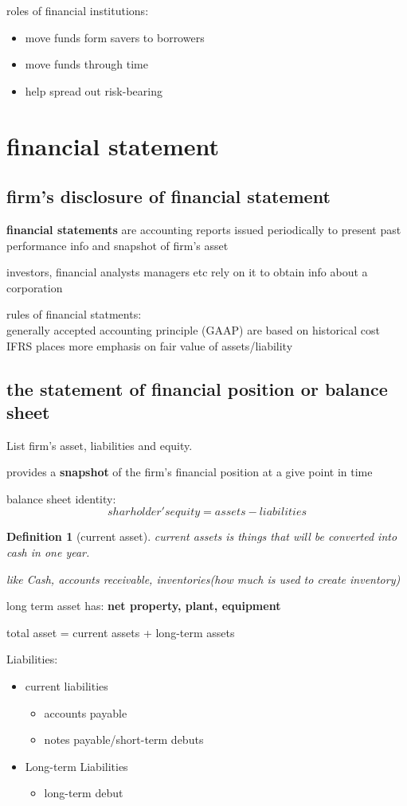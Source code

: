\documentclass[10pt]{article}
\theoremstyle{break}
\newtheorem{defn}{Definition}[subsection]
\begin{document}
roles of financial institutions:
\begin{itemize}
    \item move funds form savers to borrowers 
    \item move funds through time 
    \item help spread out risk-bearing
\end{itemize}

\section{financial statement}
\subsection{firm's disclosure of financial statement}
\textbf{financial statements} are accounting reports issued periodically to present past performance info and snapshot of firm's asset 

investors, financial analysts managers etc rely on it to obtain info about a corporation

rules of financial statments:\\
generally accepted accounting principle (GAAP) are based on historical cost 
IFRS places more emphasis on fair value of assets/liability

\subsection{the statement of financial position or balance sheet}
List firm's asset, liabilities and equity.

provides a \textbf{snapshot} of the firm's financial position at a give point in time

balance sheet identity: 
$$sharholder's equity = assets - liabilities $$

\begin{defn}[current asset]
    current assets is things that will be converted into cash in one year.

    like Cash, accounts receivable, inventories(how much is used to create inventory)
\end{defn}

long term asset has: \textbf{net property, plant, equipment}

total asset = current assets + long-term assets

Liabilities:
\begin{itemize}
    \item current liabilities \begin{itemize}
        \item accounts payable
        \item notes payable/short-term debuts
    \end{itemize}
    \item Long-term Liabilities \begin{itemize}
        \item long-term debut 
    \end{itemize}
\end{itemize}
\end{document}
